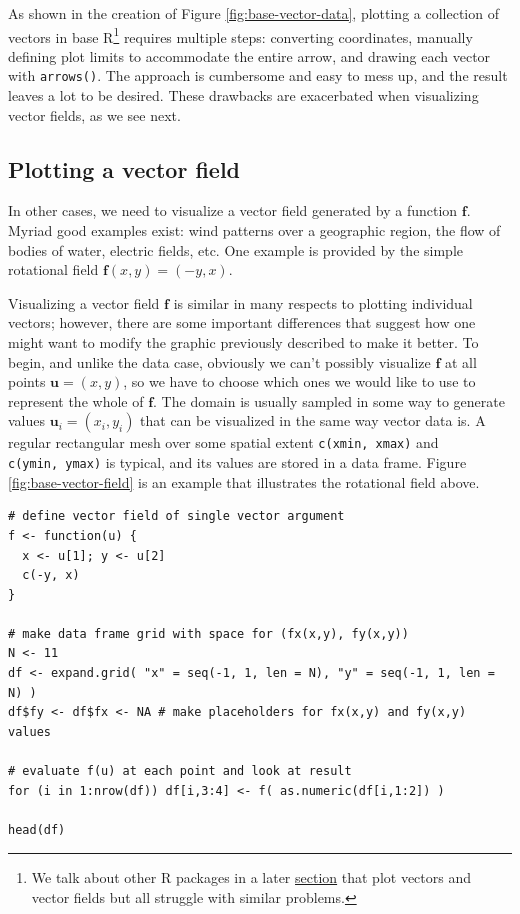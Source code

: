As shown in the creation of Figure \ref{fig:base-vector-data}, plotting a collection of vectors in base R\footnote{We talk about other R packages in a later \hyperref[sec:related]{section} that plot vectors and vector fields but all struggle with similar problems.} requires multiple steps: converting coordinates, manually defining plot limits to accommodate the entire arrow, and drawing each vector with \texttt{arrows()}. The approach is cumbersome and easy to mess up, and the result leaves a lot to be desired. These drawbacks are exacerbated when visualizing vector fields, as we see next.

\subsection{Plotting a vector field}\label{sec:plotting-a-vector-field}

In other cases, we need to visualize a vector field generated by a function \(\mathbf{f}\). Myriad good examples exist: wind patterns over a geographic region, the flow of bodies of water, electric fields, etc. One example is provided by the simple rotational field \(\mathbf{f}(x,y) = (-y, x)\).

Visualizing a vector field \(\mathbf{f}\) is similar in many respects to plotting individual vectors; however, there are some important differences that suggest how one might want to modify the graphic previously described to make it better. To begin, and unlike the data case, obviously we can't possibly visualize \(\mathbf{f}\) at all points \(\mathbf{u} = (x,y)\), so we have to choose which ones we would like to use to represent the whole of \(\mathbf{f}\). The domain is usually sampled in some way to generate values \(\mathbf{u}_{i} = (x_{i},y_{i})\) that can be visualized in the same way vector data is. A regular rectangular mesh over some spatial extent \texttt{c(xmin,\ xmax)} and \texttt{c(ymin,\ ymax)} is typical, and its values are stored in a data frame. Figure \ref{fig:base-vector-field} is an example that illustrates the rotational field above.

\begin{verbatim}
# define vector field of single vector argument
f <- function(u) {
  x <- u[1]; y <- u[2]
  c(-y, x)
}

# make data frame grid with space for (fx(x,y), fy(x,y))
N <- 11
df <- expand.grid( "x" = seq(-1, 1, len = N), "y" = seq(-1, 1, len = N) )
df$fy <- df$fx <- NA # make placeholders for fx(x,y) and fy(x,y) values

# evaluate f(u) at each point and look at result
for (i in 1:nrow(df)) df[i,3:4] <- f( as.numeric(df[i,1:2]) )

head(df)
\end{verbatim}

